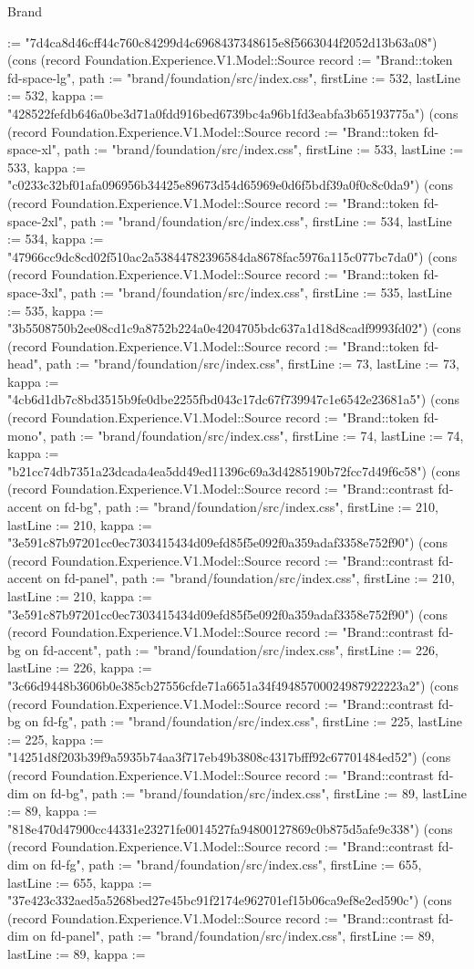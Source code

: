 \begin{lexlean}{Brand}
\begin{semanticmodule}
{:= "7d4ca8d46cff44c760c84299d4c6968437348615e8f5663044f2052d13b63a08"}) (cons (record Foundation.Experience.V1.Model::Source {record := "Brand::token fd-space-lg", path := "brand/foundation/src/index.css", firstLine := 532, lastLine := 532, kappa := "428522fefdb646a0be3d71a0fdd916bed6739bc4a96b1fd3eabfa3b65193775a"}) (cons (record Foundation.Experience.V1.Model::Source {record := "Brand::token fd-space-xl", path := "brand/foundation/src/index.css", firstLine := 533, lastLine := 533, kappa := "c0233c32bf01afa096956b34425e89673d54d65969e0d6f5bdf39a0f0c8c0da9"}) (cons (record Foundation.Experience.V1.Model::Source {record := "Brand::token fd-space-2xl", path := "brand/foundation/src/index.css", firstLine := 534, lastLine := 534, kappa := "47966cc9dc8cd02f510ac2a53844782396584da8678fac5976a115c077bc7da0"}) (cons (record Foundation.Experience.V1.Model::Source {record := "Brand::token fd-space-3xl", path := "brand/foundation/src/index.css", firstLine := 535, lastLine := 535, kappa := "3b5508750b2ee08cd1c9a8752b224a0e4204705bdc637a1d18d8cadf9993fd02"}) (cons (record Foundation.Experience.V1.Model::Source {record := "Brand::token fd-head", path := "brand/foundation/src/index.css", firstLine := 73, lastLine := 73, kappa := "4cb6d1db7c8bd3515b9fe0dbe2255fbd043c17dc67f739947c1e6542e23681a5"}) (cons (record Foundation.Experience.V1.Model::Source {record := "Brand::token fd-mono", path := "brand/foundation/src/index.css", firstLine := 74, lastLine := 74, kappa := "b21cc74db7351a23dcada4ea5dd49ed11396c69a3d4285190b72fcc7d49f6c58"}) (cons (record Foundation.Experience.V1.Model::Source {record := "Brand::contrast fd-accent on fd-bg", path := "brand/foundation/src/index.css", firstLine := 210, lastLine := 210, kappa := "3e591c87b97201cc0ec7303415434d09efd85f5e092f0a359adaf3358e752f90"}) (cons (record Foundation.Experience.V1.Model::Source {record := "Brand::contrast fd-accent on fd-panel", path := "brand/foundation/src/index.css", firstLine := 210, lastLine := 210, kappa := "3e591c87b97201cc0ec7303415434d09efd85f5e092f0a359adaf3358e752f90"}) (cons (record Foundation.Experience.V1.Model::Source {record := "Brand::contrast fd-bg on fd-accent", path := "brand/foundation/src/index.css", firstLine := 226, lastLine := 226, kappa := "3c66d9448b3606b0e385cb27556cfde71a6651a34f49485700024987922223a2"}) (cons (record Foundation.Experience.V1.Model::Source {record := "Brand::contrast fd-bg on fd-fg", path := "brand/foundation/src/index.css", firstLine := 225, lastLine := 225, kappa := "14251d8f203b39f9a5935b74aa3f717eb49b3808c4317bfff92c67701484ed52"}) (cons (record Foundation.Experience.V1.Model::Source {record := "Brand::contrast fd-dim on fd-bg", path := "brand/foundation/src/index.css", firstLine := 89, lastLine := 89, kappa := "818e470d47900cc44331e23271fe0014527fa94800127869c0b875d5afe9c338"}) (cons (record Foundation.Experience.V1.Model::Source {record := "Brand::contrast fd-dim on fd-fg", path := "brand/foundation/src/index.css", firstLine := 655, lastLine := 655, kappa := "37e423c332aed5a5268bed27e45bc91f2174e962701ef15b06ca9ef8e2ed590c"}) (cons (record Foundation.Experience.V1.Model::Source {record := "Brand::contrast fd-dim on fd-panel", path := "brand/foundation/src/index.css", firstLine := 89, lastLine := 89, kappa := }
\end{semanticmodule}
\end{lexlean}
